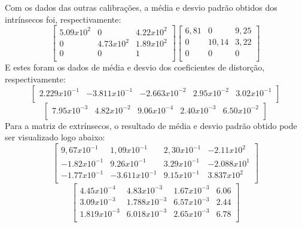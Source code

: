 \documentclass{bmvc2k}
\begin{document}
Com os dados das outras calibrações, a média e desvio padrão obtidos dos intrínsecos foi, respectivamente:
\[
\begin{bmatrix}
    5.09x10^{2} & 0 & 4.22x10^{2} \\
    0 & 4.73x10^{2} & 1.89x10^{2}\\ 0 & 0  & 1 \\
\end{bmatrix}
\begin{bmatrix}
    6,81 & 0 & 9,25\\
    0 & 10,14 & 3,22\\ 0 & 0  & 0 \\
\end{bmatrix}
\]
E estes foram os dados de média e desvio dos coeficientes de distorção, respectivamente:
\[
\begin{bmatrix}
    2.229x10^{-1} & -3.811x10^{-1} & -2.663x10^{-2} &
    2.95x10^{-2} & 3.02x10^{-1}\\
\end{bmatrix}
\]
\[
\begin{bmatrix}
    7.95x10^{-3} &  4.82x10^{-2} & 9.06x10^{-4} &
    2.40x10^{-3} & 6.50x10^{-2}\\
\end{bmatrix}\]
Para a matriz de extrínsecos, o resultado de média e desvio padrão obtido pode ser visualizado logo abaixo:
\[\begin{bmatrix}
    9,67x10^{-1} & 1,09x10^{-1} & 2,30x10^{-1} & -2.11x10^{2} \\
    -1.82x10^{-1} & 9.26x10^{-1} & 3.29x10^{-1} & 
    -2.088x10^{1}\\ -1.77x10^{-1} & -3.611x10^{-1} & 9.15x10^{-1} & 3.837x10^{2}\\
\end{bmatrix}\]
\[\begin{bmatrix}
    4.45x10^{-4} & 4.83x10^{-3} & 1.67x10^{-3} & 6.06 \\
     3.09x10^{-3} & 1.788x10^{-3} & 6.57x10^{-3} & 
    2.44\\ 1.819x10^{-3} & 6.018x10^{-3} & 2.65x10^{-3} & 6.78\\
\end{bmatrix}\]
\end{document}
